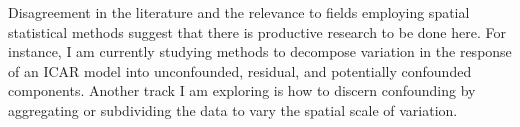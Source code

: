 \documentclass[12pt, oneside]{article}   	%
\begin{document}
Disagreement in the literature and the relevance to fields employing
spatial statistical methods suggest that there is productive research to
be done here. For instance, I am currently studying methods to decompose
variation in the response of an ICAR model into unconfounded, residual,
and potentially confounded components. Another track I am exploring is
how to discern confounding by aggregating or subdividing the data to
vary the spatial scale of variation.



\end{document}
